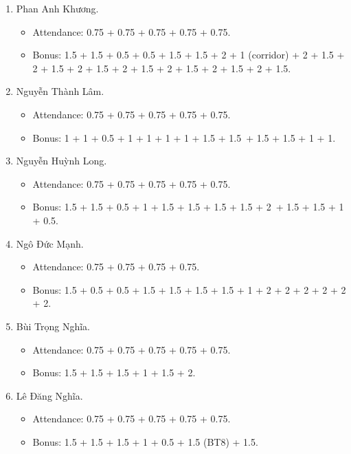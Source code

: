 \documentclass{article}
\begin{document}
\begin{enumerate}
\begin{itemize}
        \item Bonus: 1.5 + 1.5 + 1.5 + 1.5 + 1 + 1.5 + 0.5 + 1.
    \end{itemize}
    \item {\sc Phan Anh Khương.}
    \begin{itemize}
        \item Attendance: 0.75 + 0.75 + 0.75 + 0.75 + 0.75.
        \item Bonus: 1.5 + 1.5 + 0.5 + 0.5 + 1.5 + 1.5 + 2 + 1 (corridor) + 2 + 1.5 + 2 + 1.5 + 2 + 1.5 + 2 + 1.5 + 2 + 1.5 + 2 + 1.5 + 2 + 1.5.
    \end{itemize}
    \item {\sc Nguyễn Thành Lâm.}
    \begin{itemize}
        \item Attendance: 0.75 + 0.75 + 0.75 + 0.75 + 0.75.
        \item Bonus: 1 + 1 + 0.5 + 1 + 1 + 1 + 1 + 1.5 + 1.5 + 1.5 + 1.5 + 1 + 1.
    \end{itemize}
    \item {\sc Nguyễn Huỳnh Long.}
    \begin{itemize}
        \item Attendance: 0.75 + 0.75 + 0.75 + 0.75 + 0.75.
        \item Bonus: 1.5 + 1.5 + 0.5 + 1 + 1.5 + 1.5 + 1.5 + 1.5 + 2 + 1.5 + 1.5 + 1 + 0.5.
    \end{itemize}
    \item {\sc Ngô Đức Mạnh.}
    \begin{itemize}
        \item Attendance: 0.75 + 0.75 + 0.75 + 0.75.
        \item Bonus: 1.5 + 0.5 + 0.5 + 1.5 + 1.5 + 1.5 + 1.5 + 1 + 2 + 2 + 2 + 2 + 2 + 2.
    \end{itemize}
    \item {\sc Bùi Trọng Nghĩa.}
    \begin{itemize}
        \item Attendance: 0.75 + 0.75 + 0.75 + 0.75 + 0.75.
        \item Bonus: 1.5 + 1.5 + 1.5 + 1 + 1.5 + 2.
    \end{itemize}
    \item {\sc Lê Đăng Nghĩa.}
    \begin{itemize}
        \item Attendance: 0.75 + 0.75 + 0.75 + 0.75 + 0.75.
        \item Bonus: 1.5 + 1.5 + 1.5 + 1 + 0.5 + 1.5 (BT8) + 1.5.

\end{itemize}
\end{enumerate}
\end{document}
